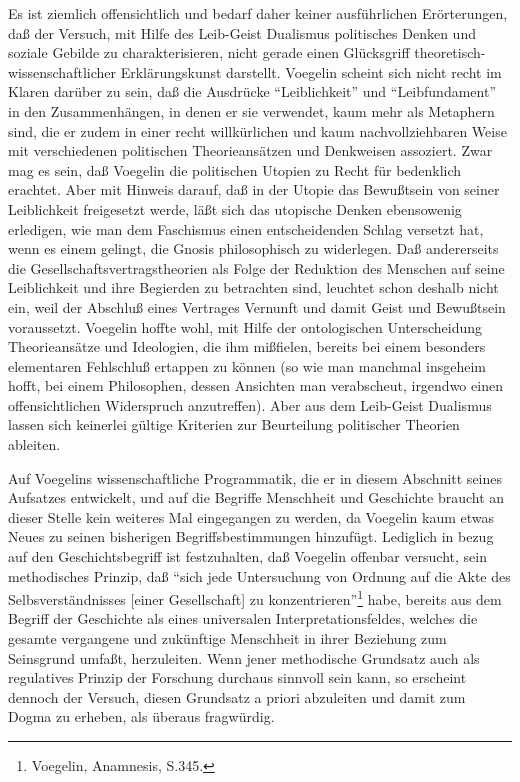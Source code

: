 Es ist ziemlich offensichtlich und bedarf daher keiner ausführlichen
Erörterungen, daß der Versuch, mit Hilfe des Leib-Geist Dualismus politisches
Denken und soziale Gebilde zu charakterisieren, nicht gerade einen Glücksgriff
theoretisch-wissenschaftlicher Erklärungskunst darstellt. Voegelin scheint
sich nicht recht im Klaren darüber zu sein, daß die Ausdrücke "`Leiblichkeit"'
und "`Leibfundament"' in den Zusammenhängen, in denen er sie verwendet, kaum
mehr als Metaphern sind, die er zudem in einer recht willkürlichen und kaum
nachvollziehbaren Weise mit verschiedenen politischen Theorieansätzen und
Denkweisen assoziert. Zwar mag es sein, daß Voegelin die politischen Utopien
zu Recht für bedenklich erachtet. Aber mit Hinweis darauf, daß in der Utopie
das Bewußtsein von seiner Leiblichkeit freigesetzt werde, läßt sich das
utopische Denken ebensowenig erledigen, wie man dem Faschismus einen
entscheidenden Schlag versetzt hat, wenn es einem gelingt, die Gnosis
philosophisch zu widerlegen. Daß andererseits die
Gesellschaftsvertragstheorien als Folge der Reduktion des Menschen auf seine
Leiblichkeit und ihre Begierden zu betrachten sind, leuchtet schon deshalb
nicht ein, weil der Abschluß eines Vertrages Vernunft und damit Geist und
Bewußtsein voraussetzt. Voegelin hoffte wohl, mit Hilfe der ontologischen
Unterscheidung Theorieansätze und Ideologien, die ihm mißfielen, bereits bei
einem besonders elementaren Fehlschluß ertappen zu können (so wie man manchmal
insgeheim hofft, bei einem Philosophen, dessen Ansichten man verabscheut,
irgendwo einen offensichtlichen Widerspruch anzutreffen). Aber aus dem
Leib-Geist Dualismus lassen sich keinerlei gültige Kriterien zur Beurteilung
politischer Theorien ableiten.

Auf Voegelins wissenschaftliche Programmatik, die er in diesem Abschnitt
seines Aufsatzes entwickelt, und auf die Begriffe Menschheit und Geschichte
braucht an dieser Stelle kein weiteres Mal eingegangen zu werden, da Voegelin
kaum etwas Neues zu seinen bisherigen Begriffsbestimmungen hinzufügt.
Lediglich in bezug auf den Geschichtsbegriff ist festzuhalten, daß Voegelin
offenbar versucht, sein methodisches Prinzip, daß "`sich jede Untersuchung von
Ordnung auf die Akte des Selbsverständnisses [einer Gesellschaft] zu
konzentrieren"'\footnote{Voegelin, Anamnesis, S.345.} habe, bereits aus dem
Begriff der Geschichte als eines universalen Interpretationsfeldes, welches
die gesamte vergangene und zukünftige Menschheit in ihrer Beziehung zum
Seinsgrund umfaßt, herzuleiten. Wenn jener methodische Grundsatz auch als
regulatives Prinzip der Forschung durchaus sinnvoll sein kann, so erscheint
dennoch der Versuch, diesen Grundsatz a priori abzuleiten und damit zum Dogma
zu erheben, als überaus fragwürdig.

